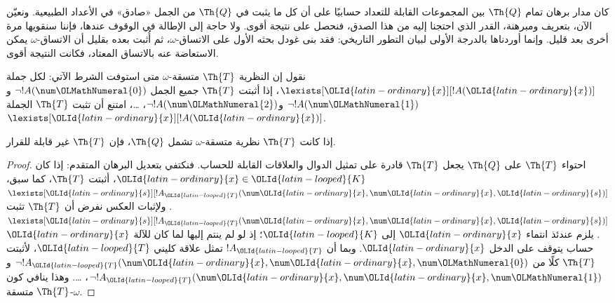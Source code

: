 \documentclass[../../../include/open-logic-section]{subfiles}
\begin{document}


\begin{explain}
كان مدار برهان تمام $\Th{Q}$ بين المجموعات القابلة للتعداد حسابيًا
على أن كل ما يثبت في $\Th{Q}$ من الجمل «صادق» في الأعداد الطبيعية.
ونعيّن الآن، بتعريف ومبرهنة، القدر الذي احتجنا إليه من هذا الصدق،
فنحصل على نتيجة أقوى. ولا حاجة إلى الإطالة في الوقوف عندها، فإننا
سنقويها مرة أخرى بعد قليل. وإنما أوردناها بالدرجة الأولى لبيان
التطور التاريخي: فقد بنى غودل بحثه الأول على الاتساق-$\omega$،
ثم أُثبت بعده بقليل أن الاتساق-$\omega$ يمكن الاستعاضة عنه بالاتساق
المعتاد، فكانت النتيجة أقوى.
\end{explain}

\begin{defn}
نقول إن النظرية $\Th{T}$ متسقة-$\omega$ متى استوفت الشرط الآتي:
لكل جملة $\lexists[\OLId{latin-ordinary}{x}][!A(\OLId{latin-ordinary}{x})]$، إذا أثبتت $\Th{T}$ جميع الجمل
$\lnot !A(\num \OLMathNumeral{0})$ و$\lnot !A(\num \OLMathNumeral{1})$ و$\lnot !A(\num \OLMathNumeral{2})$،
\dots، امتنع أن تثبت $\Th{T}$ الجملة $\lexists[\OLId{latin-ordinary}{x}][!A(\OLId{latin-ordinary}{x})]$.
\end{defn}

\begin{thm}
  إذا كانت $\Th{T}$ نظرية متسقة-$\omega$ تشمل $\Th{Q}$،
  فإن $\Th{T}$ غير قابلة للقرار.
\end{thm}

\begin{proof}
احتواء $\Th{T}$ على $\Th{Q}$ يجعل $\Th{T}$ قادرة على تمثيل الدوال
والعلاقات القابلة للحساب. فنكتفي بتعديل البرهان المتقدم:
إذا كان $\OLId{latin-ordinary}{x}\in \OLId{latin-looped}{K}$، أثبتت $\Th{T}$، كما سبق،
$\lexists[\OLId{latin-ordinary}{s}][!A_\OLId{latin-looped}{T}(\num \OLId{latin-ordinary}{x},\num \OLId{latin-ordinary}{x},\OLId{latin-ordinary}{s})]$. ولإثبات العكس نفرض أن
$\Th{T}$ تثبت $\lexists[\OLId{latin-ordinary}{s}][!A_\OLId{latin-looped}{T}(\num \OLId{latin-ordinary}{x},\num \OLId{latin-ordinary}{x},\OLId{latin-ordinary}{s})]$.
يلزم عندئذ انتماء $\OLId{latin-ordinary}{x}$ إلى $\OLId{latin-looped}{K}$؛ إذ لو لم ينتم إليها لما كان للآلة
$\OLId{latin-ordinary}{x}$ حساب يتوقف على الدخل $\OLId{latin-ordinary}{x}$. وبما أن $!A_\OLId{latin-looped}{T}$ تمثل علاقة كليني $\OLId{latin-looped}{T}$،
لأثبتت $\Th{T}$ كلًا من
$\lnot !A_\OLId{latin-looped}{T}(\num \OLId{latin-ordinary}{x},\num \OLId{latin-ordinary}{x},\num \OLMathNumeral{0})$ و
$\lnot !A_\OLId{latin-looped}{T}(\num \OLId{latin-ordinary}{x},\num \OLId{latin-ordinary}{x},\num \OLMathNumeral{1})$، \dots. وهذا ينافي كون
$\Th{T}$ متسقة-$\omega$.
\end{proof}
\end{document}
